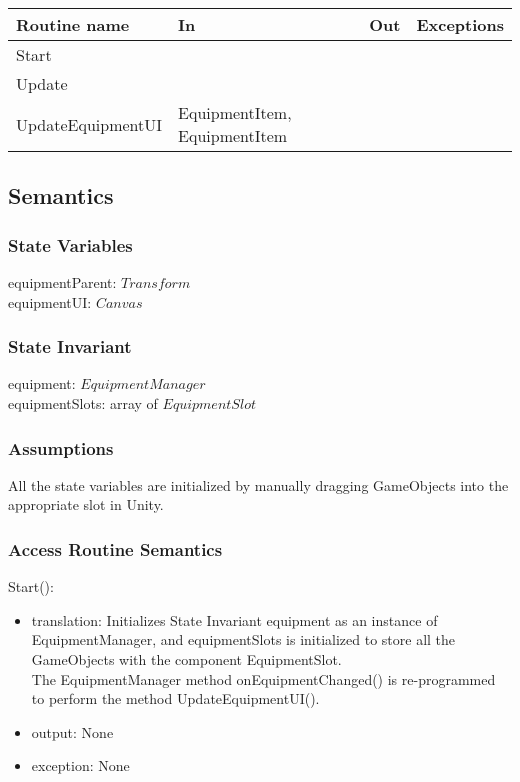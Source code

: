 \documentclass[12pt]{article}
\begin{document}
\begin{tabular}{| l | l | l | l |}
\hline
\textbf{Routine name} & \textbf{In} & \textbf{Out} & \textbf{Exceptions}\\
\hline
Start & ~ & ~  & ~\\
Update & ~ & ~ & ~\\
UpdateEquipmentUI & EquipmentItem, EquipmentItem & ~ & ~\\
\hline
\end{tabular}

\subsection* {Semantics}

\subsubsection* {State Variables}

equipmentParent: $Transform$\\
equipmentUI: $Canvas$\\

\subsubsection* {State Invariant}

equipment: $EquipmentManager$\\
equipmentSlots: array of $EquipmentSlot$

\subsubsection* {Assumptions}

All the state variables are initialized by manually dragging GameObjects into the appropriate slot in Unity.

\subsubsection* {Access Routine Semantics}

\noindent Start():
\begin{itemize}
\item translation: Initializes State Invariant equipment as an instance of EquipmentManager, and equipmentSlots is initialized to store all the GameObjects with the component EquipmentSlot.\\
The EquipmentManager method onEquipmentChanged() is re-programmed to perform the method UpdateEquipmentUI().
\item output: None
\item exception: None
\end{itemize}
\end{document}
